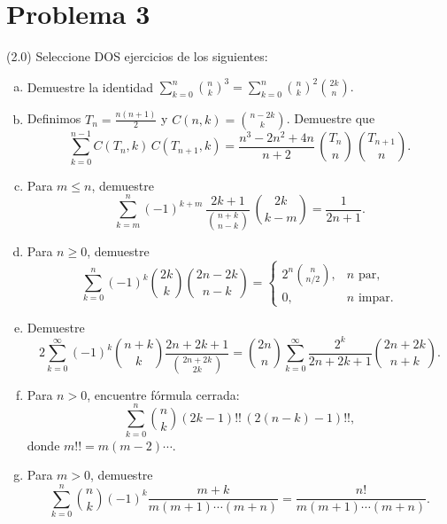 \section*{Problema 3}
(2.0) Seleccione DOS ejercicios de los siguientes:
\begin{enumerate}[a)]
  \item Demuestre la identidad 
  \(\sum_{k=0}^n \binom{n}{k}^3 = \sum_{k=0}^n \binom{n}{k}^2 \binom{2k}{n}.\)
  \item Definimos \(T_n = \tfrac{n(n+1)}{2}\) y \(C(n,k)=\binom{n-2k}{k}\). Demuestre que
  \[\sum_{k=0}^{n-1} C(T_n,k)\,C(T_{n+1},k)
    = \frac{n^3 - 2n^2 + 4n}{n+2}\,
      \binom{T_n}{n}\,\binom{T_{n+1}}{n}.\]
  \item Para \(m\le n\), demuestre
  \[\sum_{k=m}^n (-1)^{k+m}\,\frac{2k+1}{\binom{n+k}{n-k}}\,
    \binom{2k}{k-m}
    = \frac{1}{2n+1}.\]
  \item Para \(n\ge0\), demuestre
  \[\sum_{k=0}^n (-1)^k \binom{2k}{k} \binom{2n-2k}{n-k}
    = \begin{cases}
      2^n \binom{n}{n/2}, & n\text{ par},\\
      0, & n\text{ impar}.
    \end{cases}\]
  \item Demuestre
  \[2\sum_{k=0}^\infty (-1)^k \binom{n+k}{k} \frac{2n+2k+1}{\binom{2n+2k}{2k}}
    = \binom{2n}{n}\sum_{k=0}^\infty \frac{2^k}{2n+2k+1}\binom{2n+2k}{n+k}.\]
  \item Para \(n>0\), encuentre fórmula cerrada:
  \[\sum_{k=0}^n \binom{n}{k}(2k-1)!!\,(2(n-k)-1)!!,\]
  donde \(m!! = m(m-2)\cdots\).
  \item Para \(m>0\), demuestre
  \[\sum_{k=0}^n \binom{n}{k} (-1)^k \frac{m+k}{m(m+1)\cdots(m+n)}
    = \frac{n!}{m(m+1)\cdots(m+n)}.\]
\end{enumerate}
